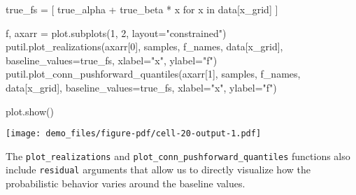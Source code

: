 \documentclass[
  letterpaper,
  DIV=11,
  numbers=noendperiod]{scrartcl}
\newenvironment{Shaded}{\begin{snugshade}}{\end{snugshade}}
\newcommand{\ControlFlowTok}[1]{\textcolor[rgb]{0.00,0.23,0.31}{#1}}
\newcommand{\DecValTok}[1]{\textcolor[rgb]{0.68,0.00,0.00}{#1}}
\newcommand{\KeywordTok}[1]{\textcolor[rgb]{0.00,0.23,0.31}{#1}}
\newcommand{\NormalTok}[1]{\textcolor[rgb]{0.00,0.23,0.31}{#1}}
\newcommand{\OperatorTok}[1]{\textcolor[rgb]{0.37,0.37,0.37}{#1}}
\newcommand{\StringTok}[1]{\textcolor[rgb]{0.13,0.47,0.30}{#1}}
\begin{document}
\begin{Shaded}
\begin{Highlighting}[]
\NormalTok{true\_fs }\OperatorTok{=}\NormalTok{ [ true\_alpha }\OperatorTok{+}\NormalTok{ true\_beta }\OperatorTok{*}\NormalTok{ x }\ControlFlowTok{for}\NormalTok{ x }\KeywordTok{in}\NormalTok{ data[}\StringTok{\textquotesingle{}x\_grid\textquotesingle{}}\NormalTok{] ]}

\NormalTok{f, axarr }\OperatorTok{=}\NormalTok{ plot.subplots(}\DecValTok{1}\NormalTok{, }\DecValTok{2}\NormalTok{, layout}\OperatorTok{=}\StringTok{"constrained"}\NormalTok{)}
\NormalTok{putil.plot\_realizations(axarr[}\DecValTok{0}\NormalTok{], samples,}
\NormalTok{                        f\_names, data[}\StringTok{\textquotesingle{}x\_grid\textquotesingle{}}\NormalTok{],}
\NormalTok{                        baseline\_values}\OperatorTok{=}\NormalTok{true\_fs,}
\NormalTok{                        xlabel}\OperatorTok{=}\StringTok{"x"}\NormalTok{, ylabel}\OperatorTok{=}\StringTok{"f"}\NormalTok{)}
\NormalTok{putil.plot\_conn\_pushforward\_quantiles(axarr[}\DecValTok{1}\NormalTok{], samples,}
\NormalTok{                                      f\_names, data[}\StringTok{\textquotesingle{}x\_grid\textquotesingle{}}\NormalTok{],}
\NormalTok{                                      baseline\_values}\OperatorTok{=}\NormalTok{true\_fs,}
\NormalTok{                                      xlabel}\OperatorTok{=}\StringTok{"x"}\NormalTok{, ylabel}\OperatorTok{=}\StringTok{"f"}\NormalTok{)}

\NormalTok{plot.show()}
\end{Highlighting}
\end{Shaded}

\texttt{[image: demo\_files/figure-pdf/cell-20-output-1.pdf]}

The \texttt{plot\_realizations} and
\texttt{plot\_conn\_pushforward\_quantiles} functions also include
\texttt{residual} arguments that allow us to directly visualize how the
probabilistic behavior varies around the baseline values.
\end{document}

